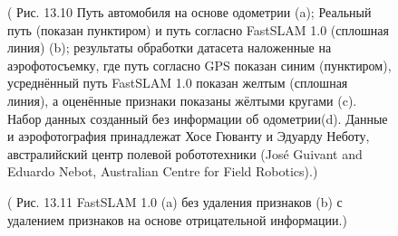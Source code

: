 \documentclass[10pt,a4paper]{article}
\begin{document}
\begin{figure}[H]
	\caption{ ( Рис. 13.10  Путь автомобиля на основе одометрии (a);  Реальный путь (показан пунктиром) и путь согласно FastSLAM 1.0 (сплошная линия) (b);  результаты обработки датасета наложенные на аэрофотосъемку, где путь согласно GPS показан синим (пунктиром), усреднённый путь FastSLAM 1.0 показан желтым (сплошная линия), а оценённые признаки показаны жёлтыми кругами (c). Набор данных созданный без информации об одометрии(d). Данные и аэрофотография принадлежат Хосе Гюванту и Эдуарду Неботу, австралийский центр полевой робототехники (José Guivant and Eduardo Nebot, Australian Centre for Field Robotics).) }
	\label{fig:1310orig}
\end{figure}

\begin{figure}[H]
	\caption{ ( Рис. 13.11 FastSLAM 1.0 (a) без удаления признаков (b) с удалением признаков на основе отрицательной информации.) }
	\label{fig:1311orig}
\end{figure}
\end{document}
